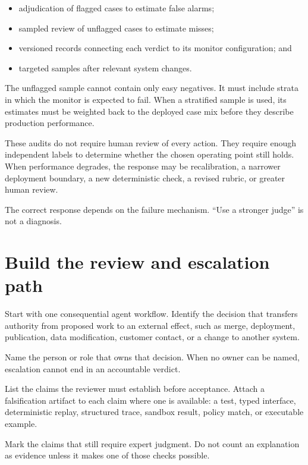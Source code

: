 \begin{itemize}
\tightlist
\item
  adjudication of flagged cases to estimate false alarms;
\item
  sampled review of unflagged cases to estimate misses;
\item
  versioned records connecting each verdict to its monitor configuration; and
\item
  targeted samples after relevant system changes.
\end{itemize}

The unflagged sample cannot contain only easy negatives. It must include strata in which the monitor is expected to fail. When a stratified sample is used, its estimates must be weighted back to the deployed case mix before they describe production performance.

These audits do not require human review of every action. They require enough independent labels to determine whether the chosen operating point still holds. When performance degrades, the response may be recalibration, a narrower deployment boundary, a new deterministic check, a revised rubric, or greater human review.

The correct response depends on the failure mechanism. ``Use a stronger judge'' is not a diagnosis.

\hypertarget{build-the-review-and-escalation-path}{%
\section{Build the review and escalation path}\label{build-the-review-and-escalation-path}}

Start with one consequential agent workflow. Identify the decision that transfers authority from proposed work to an external effect, such as merge, deployment, publication, data modification, customer contact, or a change to another system.

Name the person or role that owns that decision. When no owner can be named, escalation cannot end in an accountable verdict.

List the claims the reviewer must establish before acceptance. Attach a falsification artifact to each claim where one is available: a test, typed interface, deterministic replay, structured trace, sandbox result, policy match, or executable example.

Mark the claims that still require expert judgment. Do not count an explanation as evidence unless it makes one of those checks possible.

